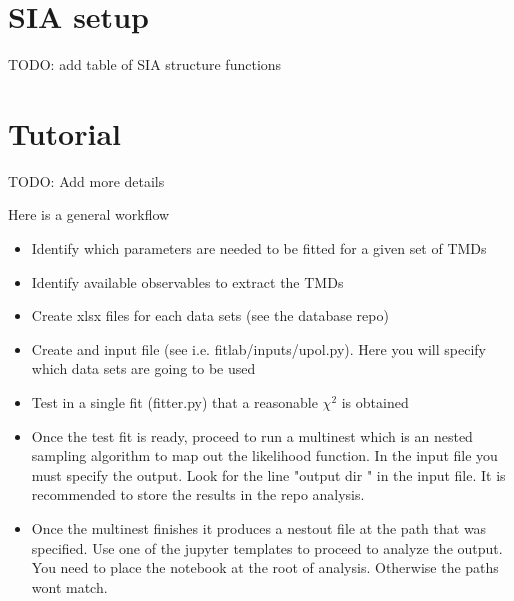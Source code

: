 \documentclass[floatfix,aps,prd,nofootinbib,superscriptaddress,preprint]{revtex4}
\newcommand\3[1]{\boldsymbol{#1}}
\begin{document}
%


\newpage
\section{SIA setup}

{\color{red} TODO: add table of SIA structure functions}

\newpage
\section{Tutorial}
{\color{red} TODO: Add more details }

Here is a general workflow

\begin{itemize}
\item Identify which parameters are needed to be fitted for a given set of TMDs
\item Identify available observables to extract the TMDs 
\item Create xlsx files for each data sets (see the database repo)
\item Create and input file (see i.e. fitlab/inputs/upol.py). Here you will specify 
      which data sets are going to be used
\item Test in a single fit (fitter.py) that a reasonable $\chi^2$ is obtained 
\item Once the test fit is ready, proceed to run a multinest which is an nested sampling algorithm 
      to map out the likelihood function. In the input file you must specify the output.
      Look for the line "output dir " in the input file. It is recommended to store the results in the 
      repo analysis. 
\item Once the multinest finishes it produces a nestout file at the path that was specified. 
      Use one of the jupyter templates to proceed to analyze the output. You need to place the notebook 
      at the root of analysis. Otherwise the paths wont match.  
\end{itemize}
\end{document}
